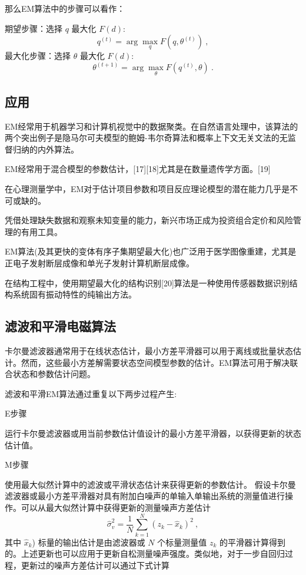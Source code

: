 那么EM算法中的步骤可以看作：

期望步骤：选择 $q$ 最大化 $F(d)$:
$$q^{(t)} = \arg \max_q F(q, \theta^{(t)})~,$$
最大化步骤：选择 $\theta$ 最大化 $F(d)$:
$$\theta^{(t+1)} = \arg \max_\theta F(q^{(t)}, \theta)~.$$

\subsection{应用}

EM经常用于机器学习和计算机视觉中的数据聚类。在自然语言处理中，该算法的两个突出例子是隐马尔可夫模型的鲍姆-韦尔奇算法和概率上下文无关文法的无监督归纳的内外算法。

EM经常用于混合模型的参数估计，[17][18]尤其是在数量遗传学方面。[19]

在心理测量学中，EM对于估计项目参数和项目反应理论模型的潜在能力几乎是不可或缺的。

凭借处理缺失数据和观察未知变量的能力，新兴市场正成为投资组合定价和风险管理的有用工具。

EM算法(及其更快的变体有序子集期望最大化)也广泛用于医学图像重建，尤其是正电子发射断层成像和单光子发射计算机断层成像。

在结构工程中，使用期望最大化的结构识别[20]算法是一种使用传感器数据识别结构系统固有振动特性的纯输出方法。

\subsection{滤波和平滑电磁算法}

卡尔曼滤波器通常用于在线状态估计，最小方差平滑器可以用于离线或批量状态估计。然而，这些最小方差解需要状态空间模型参数的估计。EM算法可用于解决联合状态和参数估计问题。

滤波和平滑EM算法通过重复以下两步过程产生:

E步骤

运行卡尔曼滤波器或用当前参数估计值设计的最小方差平滑器，以获得更新的状态估计值。

M步骤

使用最大似然计算中的滤波或平滑状态估计来获得更新的参数估计。
假设卡尔曼滤波器或最小方差平滑器对具有附加白噪声的单输入单输出系统的测量值进行操作。可以从最大似然计算中获得更新的测量噪声方差估计
\begin{equation}
\hat\sigma_v^2 = \frac{1}{N} \sum_{k=1}^{N} \left( z_k - \hat{x}_k \right)^2~,
\end{equation}
其中 $\hat{x}_k$) 标量的输出估计是由滤波器或 $N$ 个标量测量值 $z_k$ 的平滑器计算得到的。上述更新也可以应用于更新自松测量噪声强度。类似地，对于一步自回归过程，更新过的噪声方差估计可以通过下式计算

